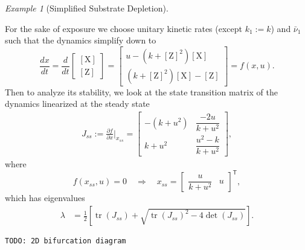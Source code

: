 \documentclass[a4paper]{article}
\newcommand{\todo}[1]{\texttt{TODO: #1}}
\newcommand{\T}{\mathsf{T}}
\newcommand{\co}[1]{[\text{#1}]} %
\DeclareMathOperator{\tr}{tr}
\theoremstyle{plain}
\theoremstyle{definition}
\theoremstyle{remark}
\newtheorem*{example}{Example}
\begin{document}
\begin{example}[Simplified Substrate Depletion]
\begin{center}
  \end{center}
  For the sake of exposure we choose unitary kinetic rates (except $k_1 := k$)
  and $\bar{\nu}_1$ such that the dynamics simplify down to
  \[
    \frac{dx}{dt} = 
    \frac{d}{dt} \begin{bmatrix} \co{X} \\ \co{Z} \end{bmatrix}
    = \begin{bmatrix}
      u - (k + \co{Z}^2) \co{X} \\
      (k + \co{Z}^2) \co{X} - \co{Z}
    \end{bmatrix}
    = f(x, u).
  \]
  Then to analyze its stability, we look at the state transition matrix of the
  dynamics linearized at the steady state
  \begin{align*}
    J_{ss} :=
    \frac{\partial f}{\partial x} \bigg|_{x_{ss}}
    = \begin{bmatrix}
      - (k + u^2) & \dfrac{-2u}{k + u^2} \\
      k + u^2 & \dfrac{u^2 - k}{k + u^2}
    \end{bmatrix},
  \end{align*}
  where
  \[
    f(x_{ss}, u) = 0 
    \quad \Rightarrow \quad 
    x_{ss} = \begin{bmatrix}
      \dfrac{u}{k + u^2} &
      u
    \end{bmatrix}^\T,
  \]
  which has eigenvalues
  \begin{align*}
    \lambda &= \frac{1}{2} \left[
      \tr (J_{ss}) + \sqrt{
        \tr (J_{ss})^2 - 4 \det (J_{ss})
      }
    \right].
  \end{align*}

  \todo{2D bifurcation diagram}
\end{example}
\end{document}
